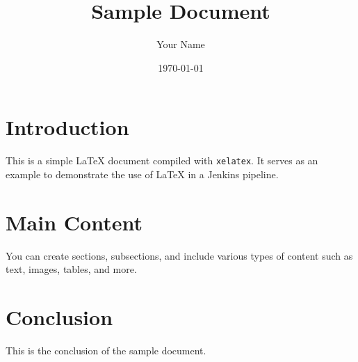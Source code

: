 \documentclass{article}
\title{Sample Document}
\author{Your Name}
\date{\today}
\begin{document}
\maketitle

\section{Introduction}

This is a simple LaTeX document compiled with \texttt{xelatex}. It serves as an example to demonstrate the use of LaTeX in a Jenkins pipeline.

\section{Main Content}

You can create sections, subsections, and include various types of content such as text, images, tables, and more.

\section{Conclusion}

This is the conclusion of the sample document.
\end{document}
